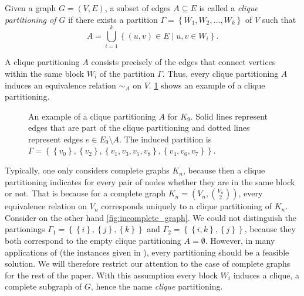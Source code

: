 \begin{definition}[\CP]\label{def:cp}
	Given a graph $G=(V,E)$, a subset of edges $A \subseteq E$ is called a \textit{clique partitioning of $G$} if there exists a partition $\Gamma = \left\{ W_1, W_2, \ldots, W_k \right\}$ of $V$ such that
	\[
		A = \bigcup_{i=1}^k \left\{ (u,v) \in E \mid u,v \in W_i \right\}.
	\]
\end{definition}
A clique partitioning $A$ consists precisely of the edges that connect vertices within the same block $W_i$ of the partition $\Gamma$.
Thus, every clique partitioning $A$ induces an equivalence relation $\sim_A$ on $V$.
\cref{fig:example_clique_partitioning} shows an example of a clique partitioning.

\begin{figure}[H]
	\centering
	\caption[Example clique partitioning]{An example of a clique partitioning $A$ for $K_{9}$. 
		Solid lines represent edges that are part of the clique partitioning and dotted lines represent edges $e \in E_{9} \setminus A$.
	The induced partition is $\Gamma = \left\{ \left\{ v_{0} \right\}, \left\{ v_{2} \right\}, \left\{ v_{1}, v_{3}, v_{5}, v_{8} \right\}, \left\{ v_{4}, v_{6}, v_{7} \right\} \right\}$.}
	\label{fig:example_clique_partitioning}
\end{figure}

Typically, one only considers complete graphs $K_n$, because then a clique partitioning indicates for every pair of nodes whether they are in the same block or not.
That is because for a complete graph $K_{n} = (V_{n}, \binom{V_{n}}{2})$, every equivalence relation on $V_{n}$ corresponds uniquely to a clique partitioning of $K_{n}$.
Consider on the other hand \cref{fig:incomplete_graph}.
We could not distinguish the partionings $\Gamma_{1} = \left\{ \left\{ i \right\}, \left\{ j \right\}, \left\{ k \right\} \right\}$ and $\Gamma_{2} = \left\{ \left\{ i, k \right\}, \left\{ j \right\} \right\}$, because they both correspond to the empty clique partitioning $A = \emptyset$.
However, in many applications of \CP (\eg the instances given in \cite{grotschelCuttingPlaneAlgorithm1989}), every partitioning should be a feasible solution.
We will therefore restrict our attention to the case of complete graphs for the rest of the paper.
With this assumption every block $W_i$ induces a clique, \ie a complete subgraph of $G$, hence the name \textit{clique} partitioning.

